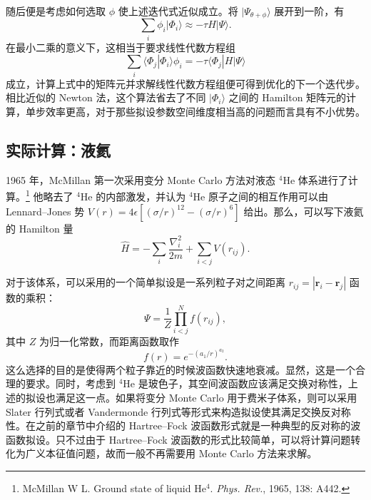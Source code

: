 随后便是考虑如何选取 $\phi$ 使上述迭代式近似成立。将 $|\Psi_{\theta+\phi}\rangle$ 展开到一阶，有
\begin{equation}
\sum_i\phi_i|\Phi_i\rangle\approx-\tau H|\Psi\rangle.
\tag{7.6.11}
\end{equation}
在最小二乘的意义下，这相当于要求线性代数方程组
\begin{equation}
\sum_i\langle\Phi_j|\Phi_i\rangle\phi_i=-\tau\langle\Phi_j|H|\Psi\rangle
\tag{7.6.12}
\end{equation}
成立，计算上式中的矩阵元并求解线性代数方程组便可得到优化的下一个迭代步。相比近似的 Newton 法，这个算法省去了不同 $|\Phi_i\rangle$ 之间的 Hamilton 矩阵元的计算，单步效率更高，对于那些拟设参数空间维度相当高的问题而言具有不小优势。

\subsection{实际计算：液氦}

1965 年，McMillan 第一次采用变分 Monte Carlo 方法对液态 $^4$He 体系进行了计算。\footnote{McMillan W L. Ground state of liquid He$^4$. \emph{Phys. Rev.}, 1965, 138: A442.} 他略去了 $^4$He 的内部激发，并认为 $^4$He 原子之间的相互作用可以由 Lennard--Jones 势 $V(r)=4\epsilon[(\sigma/r)^{12}-(\sigma/r)^6]$ 给出。那么，可以写下液氦的 Hamilton 量
\begin{equation}
\hat H=-\sum_i\frac{\nabla_i^2}{2m}+\sum_{i<j}V(r_{ij}).
\tag{7.6.13}
\end{equation}

对于该体系，可以采用的一个简单拟设是一系列粒子对之间距离 $r_{ij}=|\mathbf r_i-\mathbf r_j|$ 函数的乘积：
\begin{equation}
\Psi=\frac1Z\prod_{i<j}^{N}f(r_{ij}),
\tag{7.6.14}
\end{equation}
其中 $Z$ 为归一化常数，而距离函数取作
\begin{equation}
f(r)=e^{-(a_1/r)^{a_2}}.
\tag{7.6.15}
\end{equation}
这么选择的目的是使得两个粒子靠近的时候波函数快速地衰减。显然，这是一个合理的要求。同时，考虑到 $^4$He 是玻色子，其空间波函数应该满足交换对称性，上述的拟设也满足这一点。如果将变分 Monte Carlo 用于费米子体系，则可以采用 Slater 行列式或者 Vandermonde 行列式等形式来构造拟设使其满足交换反对称性。在之前的章节中介绍的 Hartree--Fock 波函数形式就是一种典型的反对称的波函数拟设。只不过由于 Hartree--Fock 波函数的形式比较简单，可以将计算问题转化为广义本征值问题，故而一般不再需要用 Monte Carlo 方法来求解。

